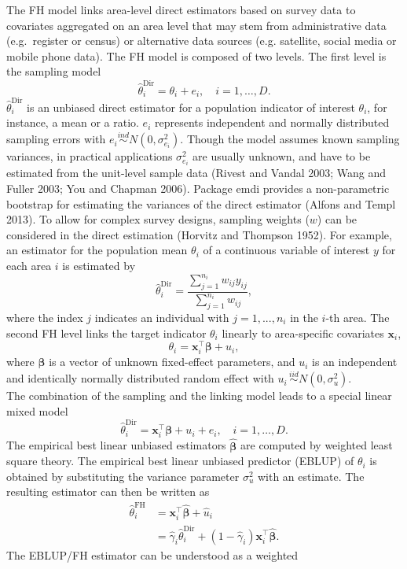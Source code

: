 The FH model links area-level direct estimators based on survey data to
covariates aggregated on an area level that may stem from administrative
data (e.g.~register or census) or alternative data sources (e.g.
satellite, social media or mobile phone data). The FH model is composed
of two levels. The first level is the sampling model
\[\hat{\theta}_{i}^{\text{Dir}}=\theta_{i} + e_{i}, \quad i=1,\ldots,D.\]
\(\hat{\theta}_{i}^{\text{Dir}}\) is an unbiased direct estimator for a
population indicator of interest \(\theta_{i}\), for instance, a mean or a
ratio. \(e_{i}\) represents independent and normally distributed sampling
errors with
\(e_{i} \stackrel{ind}{\sim} N\left(0,\sigma_{e_{i}}^2\right)\). Though
the model assumes known sampling variances, in practical applications
\(\sigma_{e_{i}}^2\) are usually unknown, and have to be estimated from
the unit-level sample data (Rivest and Vandal 2003; Wang and Fuller 2003; You and Chapman 2006). Package
emdi provides a non-parametric bootstrap for estimating the variances of
the direct estimator (Alfons and Templ 2013). To allow for complex survey designs,
sampling weights (\(w\)) can be considered in the direct estimation
(Horvitz and Thompson 1952). For example, an estimator for the population mean
\(\theta_{i}\) of a continuous variable of interest \(y\) for each area \(i\)
is estimated by \[\hat{\theta}_{i}^{\text{Dir}} =
\frac{\sum_{j=1}^{n_i} w_{ij} y_{ij}}{\sum_{j=1}^{n_i} w_{ij}},\] where
the index \(j\) indicates an individual with \(j = 1, ..., n_i\) in the
\(i\)-th area. The second FH level links the target indicator \(\theta_i\)
linearly to area-specific covariates \(\boldsymbol{x}_i\),
\[\theta_i = \boldsymbol{x}^{\top}_i \boldsymbol{\beta} +u_{i},\] where
\(\boldsymbol{\beta}\) is a vector of unknown fixed-effect parameters, and
\(u_i\) is an independent and identically normally distributed random
effect with
\(u_{i} \, \stackrel{iid}{\sim} N\left(0,\sigma_{u}^2\right)\).\\
The combination of the sampling and the linking model leads to a special
linear mixed model
\[\hat{\theta}_{i}^{\text{Dir}}=\boldsymbol{x}^{\top}_i \boldsymbol{\beta} +u_{i}
+ e_{i},
\quad i=1,\ldots,D.
\label{eq:Combination}\] The empirical best linear unbiased estimators
\(\boldsymbol{\hat{\beta}}\) are computed by weighted least square theory.
The empirical best linear unbiased predictor (EBLUP) of \(\theta_i\) is
obtained by substituting the variance parameter \(\sigma_u^2\) with an
estimate. The resulting estimator can then be written as
\[\begin{aligned}
\nonumber \hat{\theta}_i^{\text{FH}}&=
\boldsymbol{x}_i^{\top}\boldsymbol{\hat{\beta}} + \hat{u}_i \\
&=\hat{\gamma}_i\hat{\theta}_i^{\text{Dir}}+\left(1-\hat{\gamma}_i\right)
\boldsymbol{x}_i^{\top}\boldsymbol{\hat{\beta}}.
\label{eq:EBLUP}
\end{aligned}\] The EBLUP/FH estimator can be understood as a weighted
